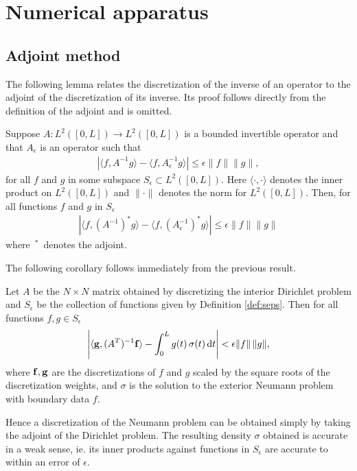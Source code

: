 
\section{Numerical apparatus}
\subsection{Adjoint method}

The following lemma relates the discretization of the inverse of an operator to the adjoint of the discretization of its inverse. Its proof follows directly from the definition of the adjoint and is omitted.
\begin{lemma}\label{lem_adjm}
Suppose $A: L^2([0,L]) \to L^2([0,L])$ is a bounded invertible operator and that $A_\epsilon$ is an operator such that
\begin{align}
\left| \langle f,A^{-1} g \rangle - \langle f,A^{-1}_\epsilon g \rangle \right| \le \epsilon \|f\| \|g\|,
\end{align}
for all $f$ and $g$ in some subspace $S_{\epsilon} \subset L^2([0,L]).$ Here $\langle \cdot, \cdot \rangle$ denotes the inner product on $L^2([0,L])$ and $\| \cdot\|$ denotes the norm for $L^2([0,L]).$ Then, for all functions $f$ and $g$ in $S_{\epsilon}$
\begin{align}
\left| \langle f,(A^{-1})^* g \rangle - \langle f,\left(A^{-1}_\epsilon\right)^* g \rangle \right| \le \epsilon \|f\| \|g\|
\end{align}
where $\,{{}^*}\,$ denotes the adjoint.
\end{lemma}

The following corollary follows immediately from the previous result.
\begin{corollary}
Let $A$ be the $N\times N$ matrix obtained by discretizing the interior Dirichlet problem and $S_\epsilon$ be the collection of functions given by Definition \ref{def:seps}. Then for all functions $f,g \in S_\epsilon$
\begin{align}
\left| \langle {\bf g}, (A^T)^{-1}{\bf f} \rangle - \int_0^L g(t)\,\sigma(t)\,{\rm d}t \right| < \epsilon \|f\|\, \|g\|,
\end{align}
where ${\bf f},{\bf g}$ are the discretizations of $f$ and $g$ scaled by the square roots of the discretization weights, and $\sigma$ is the solution to the exterior Neumann problem with boundary data $f$.
\end{corollary}

Hence a discretization of the Neumann problem can be obtained simply by taking the adjoint of the Dirichlet problem. The resulting density $\sigma$ obtained is accurate in a weak sense, ie. its inner products against functions in $S_\epsilon$ are accurate to within an error of $\epsilon.$

